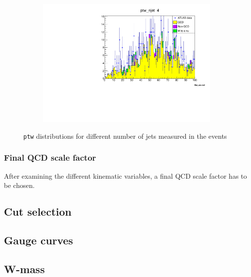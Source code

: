 \begin{figure}[H]
\begin{subfigure}{0.5\textwidth}
            \includegraphics[width=\textwidth]{../W_mass/ptw_njet4.pdf}
        \end{subfigure}
        \caption{\texttt{ptw} distributions for different number of jets measured in the events}
        \label{fig:ptw_jets}
    \end{figure}
    
\subsubsection{Final QCD scale factor}
    \label{sec:final_qcd}
    After examining the different kinematic variables, a final QCD scale factor has to be chosen. 




\subsection{Cut selection}

\subsection{Gauge curves}

\subsection{W-mass }
